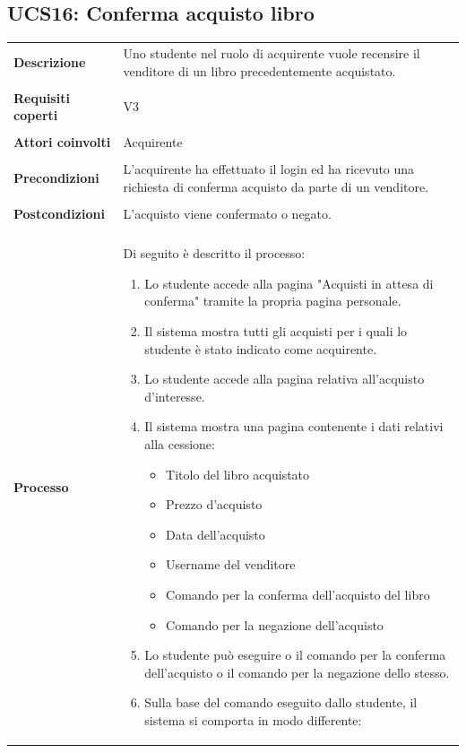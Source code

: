 \documentclass[10pt,a4paper]{report}
\begin{document}
	\subsection{UCS16: Conferma acquisto libro}
	\begin{tabular}{lp{}}
		\textbf{Descrizione}&Uno studente nel ruolo di acquirente vuole recensire il venditore di un libro precedentemente acquistato.\\
		\\
		\textbf{Requisiti coperti}&V3\\
		\\
		\textbf{Attori coinvolti}&Acquirente\\
		\\
		\textbf{Precondizioni}&L'acquirente ha effettuato il login ed ha ricevuto una richiesta di conferma acquisto da parte di un venditore.\\
		\\
		\textbf{Postcondizioni}&L'acquisto viene confermato o negato.\\
		\\
		\textbf{Processo}&Di seguito è descritto il processo:
		\begin{enumerate}
			\item Lo studente accede alla pagina "Acquisti in attesa di conferma" tramite la propria pagina personale.
			\item Il sistema mostra tutti gli acquisti per i quali lo studente è stato indicato come acquirente.
			\item Lo studente accede alla pagina relativa all'acquisto d'interesse.
			\item Il sistema mostra una pagina contenente i dati relativi alla cessione:
			\begin{itemize}
				\item Titolo del libro acquistato
				\item Prezzo d'acquisto
				\item Data dell'acquisto
				\item Username del venditore
				\item Comando per la conferma dell'acquisto del libro
				\item Comando per la negazione dell'acquisto
			\end{itemize}
			\item Lo studente può eseguire o il comando per la conferma dell'acquisto o il comando per la negazione dello stesso.
			\item Sulla base del comando eseguito dallo studente, il sistema si comporta in modo differente:

\end{enumerate}
\end{tabular}
\end{document}

